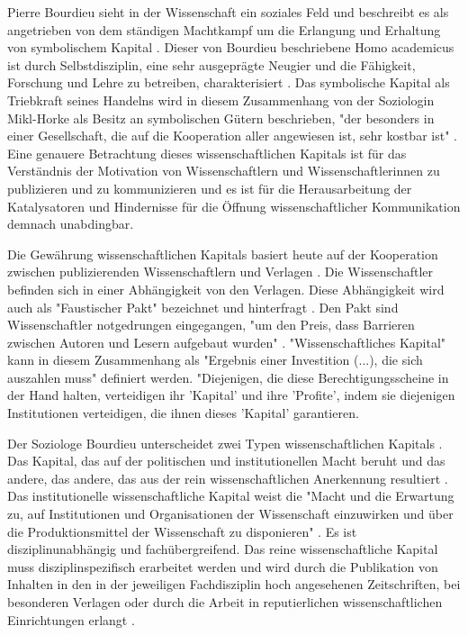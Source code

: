 Pierre Bourdieu sieht in der Wissenschaft ein soziales Feld und beschreibt es als angetrieben von dem ständigen Machtkampf um die Erlangung und Erhaltung von symbolischem Kapital \cite{Bourdieu_1988}. Dieser von Bourdieu beschriebene Homo academicus ist durch Selbstdisziplin, eine sehr ausgeprägte Neugier und die Fähigkeit, Forschung und Lehre zu betreiben, charakterisiert \cite{Bourdieu_1988}. Das symbolische Kapital als Triebkraft seines Handelns wird in diesem Zusammenhang von der Soziologin Mikl-Horke als Besitz an symbolischen Gütern beschrieben, "der besonders in einer Gesellschaft, die auf die Kooperation aller angewiesen ist, sehr kostbar ist" \cite{Mikl_2010}. Eine genauere Betrachtung dieses wissenschaftlichen Kapitals ist für das Verständnis der Motivation von Wissenschaftlern und Wissenschaftlerinnen zu publizieren und zu kommunizieren und es ist für die Herausarbeitung der Katalysatoren und Hindernisse für die Öffnung wissenschaftlicher Kommunikation demnach unabdingbar.

Die Gewährung wissenschaftlichen Kapitals basiert heute auf der Kooperation zwischen publizierenden Wissenschaftlern und Verlagen \cite{Herb_2006}. Die Wissenschaftler befinden sich in einer Abhängigkeit von den Verlagen. Diese Abhängigkeit wird auch als "Faustischer Pakt" bezeichnet und hinterfragt \cite{Hagner_2015} \cite{Parks_2002}. Den Pakt sind Wissenschaftler notgedrungen eingegangen, "um den Preis, dass Barrieren zwischen Autoren und Lesern aufgebaut wurden" \cite{Hagner_2015}. "Wissenschaftliches Kapital" kann in diesem Zusammenhang als "Ergebnis einer Investition (...), die sich auszahlen muss" \cite{Herb_2006} definiert werden. "Diejenigen, die diese Berechtigungsscheine in der Hand halten, verteidigen ihr 'Kapital' und ihre 'Profite', indem sie diejenigen Institutionen verteidigen, die ihnen dieses 'Kapital' garantieren. \cite{Bourdieu_1992}

Der Soziologe Bourdieu unterscheidet zwei Typen wissenschaftlichen Kapitals \cite{Bourdieu_1998}. Das Kapital, das auf der politischen und institutionellen Macht beruht und das andere, das andere, das aus der rein wissenschaftlichen Anerkennung resultiert \cite{Mikl_2010}. Das institutionelle wissenschaftliche Kapital weist die "Macht und die Erwartung zu, auf Institutionen und Organisationen der Wissenschaft einzuwirken und über die Produktionsmittel der Wissenschaft zu disponieren" \cite[:257]{Barloesius_2008}. Es ist disziplinunabhängig und fachübergreifend. Das reine wissenschaftliche Kapital muss disziplinspezifisch erarbeitet werden und wird durch die Publikation von Inhalten in den in der jeweiligen Fachdisziplin hoch angesehenen Zeitschriften, bei besonderen Verlagen oder durch die Arbeit in reputierlichen wissenschaftlichen Einrichtungen erlangt \cite[:257]{Barloesius_2008}.

